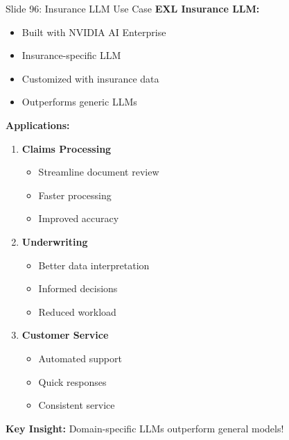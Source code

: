 \documentclass[8pt]{beamer}
\begin{document}
	\begin{frame}{Slide 96: Insurance LLM Use Case}
		\fontsize{6.5}{7.5}\selectfont
		\textbf{EXL Insurance LLM:}
		\begin{itemize}
			\item Built with NVIDIA AI Enterprise
			\item Insurance-specific LLM
			\item Customized with insurance data
			\item Outperforms generic LLMs
		\end{itemize}
		
		\vspace{0.1cm}
		\textbf{Applications:}
		\begin{enumerate}
			\item \textbf{Claims Processing}
			\begin{itemize}
				\item Streamline document review
				\item Faster processing
				\item Improved accuracy
			\end{itemize}
			\item \textbf{Underwriting}
			\begin{itemize}
				\item Better data interpretation
				\item Informed decisions
				\item Reduced workload
			\end{itemize}
			\item \textbf{Customer Service}
			\begin{itemize}
				\item Automated support
				\item Quick responses
				\item Consistent service
			\end{itemize}
		\end{enumerate}
		
		\textcolor{myblue}{\textbf{Key Insight:}} Domain-specific LLMs outperform general models!
	\end{frame}
	
\end{document}
